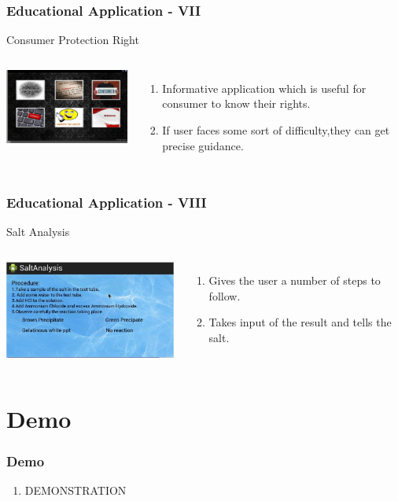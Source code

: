 \documentclass[12pt]{beamer}
\begin{document}
\begin{frame}[c]
\frametitle{Educational Application - VII}
\begin{block}{Consumer Protection Right}
 \begin{columns}[c]
   \includegraphics[width=6cm]{./app8.jpg}
  \begin{enumerate}
   \item \vskip-20pt Informative application which is useful for consumer to know their rights.
   \item If user faces some sort of difficulty,they can get precise guidance.
  \end{enumerate}
 \end{columns}
\end{block}
\end{frame}

\begin{frame}[c]
\frametitle{Educational Application - VIII}
\begin{block}{Salt Analysis}
 \begin{columns}[c]
   \includegraphics[width=6cm]{./h2.jpg}
  \begin{enumerate}
   \item \vskip-20pt Gives the user a number of steps to follow.
   \item Takes input of the result and tells the salt.
  \end{enumerate}
 \end{columns}
\end{block}
\end{frame}





\section{Demo}
\begin{frame}[c]
\frametitle{Demo}
\begin{enumerate}
\item \vskip-30pt \large DEMONSTRATION
\end{enumerate}
\end{frame}
\end{document}
